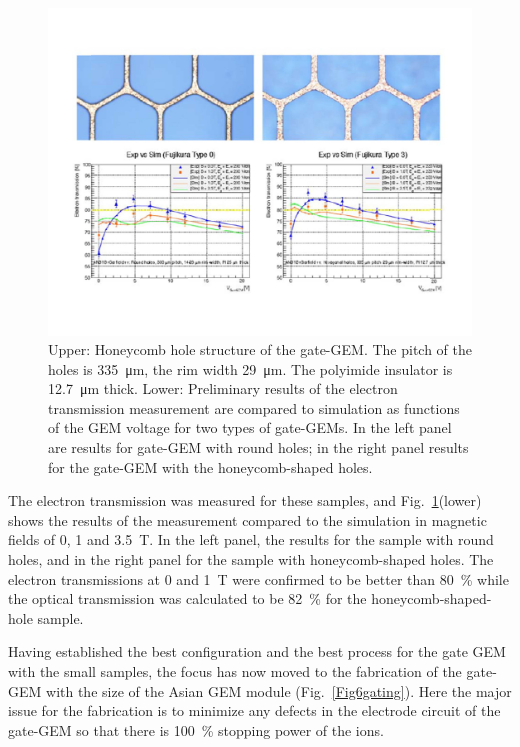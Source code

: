 \begin{figure}[htb!]
\begin{center}
\includegraphics[width=\columnwidth]{Tracker/TPC_Bonn/plots/TPC-Gate_Fig45gating.pdf}%
\caption{\label{Fig45gating} {Upper: Honeycomb hole structure of the gate-GEM.
The pitch of the holes is \SI{335}{\micro\meter}, the rim width \SI{29}{\micro\meter}.
The polyimide insulator is \SI{12.7}{\micro\meter} thick.
Lower: Preliminary results of the electron transmission measurement are compared to simulation
as functions of the GEM voltage for two types of gate-GEMs. In the left panel are
results for gate-GEM with round holes; in the right panel results for the gate-GEM with the honeycomb-shaped holes.}}
\end{center}
\end{figure}


The electron transmission was measured for these samples, and
Fig.~\ref{Fig45gating}(lower) shows the results of the measurement compared to the simulation in magnetic fields
of 0, 1 and \SI{3.5}{\tesla}. In the left panel, the results for the sample with round holes, and in the right panel
for the sample with honeycomb-shaped holes.  The electron transmissions at 0 and \SI{1}{\tesla} were confirmed
to be better than \SI{80}{\percent} while the optical transmission was calculated to be \SI{82}{\percent} for the honeycomb-shaped-hole sample.

Having established the best configuration and the best process for the gate GEM with the small samples,
the focus has now moved to the fabrication of the gate-GEM with  the size of the Asian GEM module (Fig.~\ref{Fig6gating}).
Here the major issue for the fabrication is to minimize any defects in the electrode circuit of the gate-GEM
so that there is \SI{100}{\percent} stopping power of the ions.

